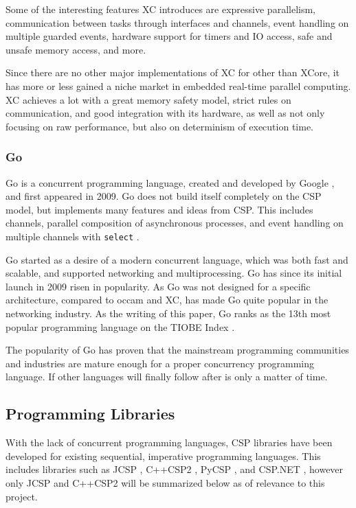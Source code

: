 Some of the interesting features XC introduces are expressive parallelism, communication between tasks through interfaces and channels, event handling on multiple guarded events, hardware support for timers and IO access, safe and unsafe memory access, and more.

Since there are no other major implementations of XC for other than XCore, it has more or less gained a niche market in embedded real-time parallel computing. XC achieves a lot with a great memory safety model, strict rules on communication, and good integration with its hardware, as well as not only focusing on raw performance, but also on determinism of execution time. 

\subsubsection{Go}
\label{sssec:go}

Go is a concurrent programming language, created and developed by Google \citep{golangintro}, and first appeared in 2009. Go does not build itself completely on the CSP model, but implements many features and ideas from CSP. This includes channels, parallel composition of asynchronous processes, and event handling on multiple channels with \texttt{select} \citep{golangspec}.

Go started as a desire of a modern concurrent language, which was both fast and scalable, and supported networking and multiprocessing. Go has since its initial launch in 2009 risen in popularity. As Go was not designed for a specific architecture, compared to occam and XC, has made Go quite popular in the networking industry. As the writing of this paper, Go ranks as the 13th most popular programming language on the TIOBE Index \citep{gopopularity}.

The popularity of Go has proven that the mainstream programming communities and industries are mature enough for a proper concurrency programming language. If other languages will finally follow after is only a matter of time.


\subsection{Programming Libraries}
\label{subsec:csp_prog_lib}

With the lack of concurrent programming languages, CSP libraries have been developed for existing sequential, imperative programming languages. This includes libraries such as JCSP \citep{jcsp}, C++CSP2 \citep{c++csp2}, PyCSP \citep{pycsp}, and CSP.NET \citep{cspnet}, however only JCSP and C++CSP2 will be summarized below as of relevance to this project.


